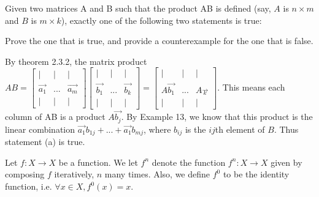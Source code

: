 \documentclass[12pt]{exam}
\newcommand{\reals}{\mathbb{R}}
\begin{document}
\begin{questions}
\question Given two matrices A and B such that the product AB is defined (say, $A$ is $n \times m$ and $B$ is $m \times k$), exactly one of the following two statements is true:
    Prove the one that is true, and provide a counterexample for the one that is false.
    \begin{solution}
        By theorem 2.3.2, the matrix product $AB = \begin{bmatrix*}
            | & | &  | \\
            \vec{a_1} & ... & \vec{a_m} \\
            | & | & |
        \end{bmatrix*}\begin{bmatrix*}
            | & | &  | \\
            \vec{b_1} & ... & \vec{b_k} \\
            | & | & |
        \end{bmatrix*} = \begin{bmatrix*}
            | & | &  | \\
            A\vec{b_1} & ... & A\vec{_k} \\
            | & | & |
        \end{bmatrix*}$. This means each column of AB is a product $A\vec{b_j}$. By Example 13, we know that this product is the linear combination $\vec{a_1} b_{1j} + ... + \vec{a_1} b_{mj}$, where $b_{ij}$ is the $ij$th element of $B$. Thus statement (a) is true.
    \end{solution}

\question Let $f : X \rightarrow X$ be a function. We let $f^n$ denote the function $f^n : X \rightarrow X$ given by
composing $f$ iteratively, $n$ many times. Also, we define $f^0$ to be the identity function, i.e. $\forall x \in X, f^0(x) = x$.
\end{questions}
\end{document}
